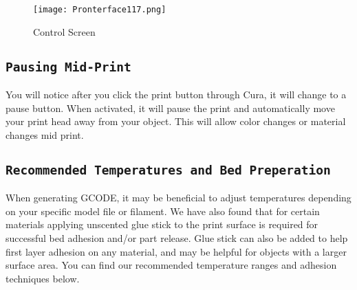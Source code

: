 \begin{figure}[H]
\centering
\texttt{[image: Pronterface117.png]}
\caption{Control Screen}
\label{fig:Control}
\end{figure}

\subsection{\texttt{Pausing Mid-Print}}
You will notice after you click the print button through Cura, it will change to a pause button. When activated, it will pause the print and automatically move your print head away from your object. This will allow color changes or material changes mid print.

\subsection{\texttt{Recommended Temperatures and Bed Preperation}}
When generating GCODE, it may be beneficial to adjust temperatures depending on your specific model file or filament. We have also found that for certain materials applying unscented glue stick to the print surface is required for successful bed adhesion and/or part release. Glue stick can also be added to help first layer adhesion on any material, and may be helpful for objects with a larger surface area. You can find our recommended temperature ranges and adhesion techniques below.

